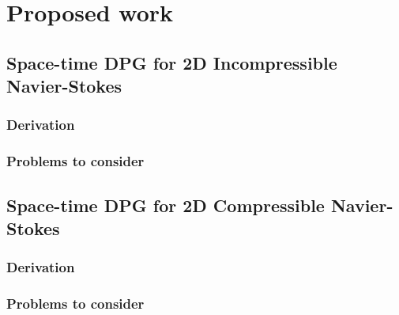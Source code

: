 \documentclass[Proposal.tex]{subfiles}
\begin{document}
\chapter{Proposed work}



\section{Space-time DPG for 2D Incompressible Navier-Stokes}

\subsection{Derivation}

\subsection{Problems to consider}


\section{Space-time DPG for 2D Compressible Navier-Stokes}

\subsection{Derivation}

\subsection{Problems to consider}
\end{document}
